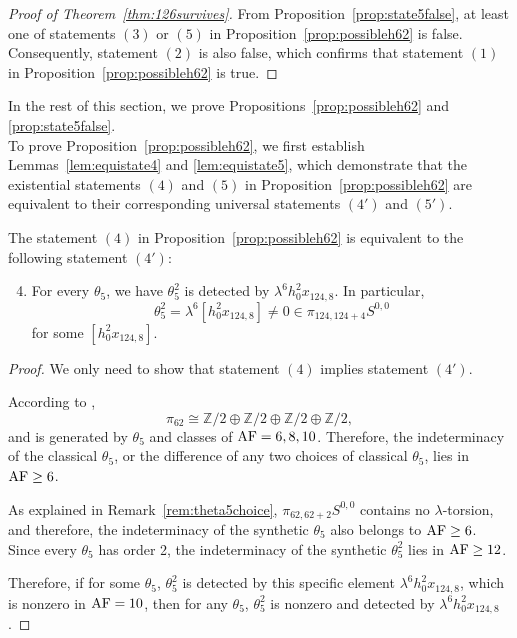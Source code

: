 \begin{proof}[Proof of Theorem~\ref{thm:126survives}]
    From Proposition~\ref{prop:state5false}, at least one of  statements $(3)$ or $(5)$ in Proposition~\ref{prop:possibleh62} is false. Consequently,  statement $(2)$ is also false, which confirms that statement $(1)$ in Proposition~\ref{prop:possibleh62} is true.  
\end{proof}

In the rest of this section, we prove Propositions~\ref{prop:possibleh62} and \ref{prop:state5false}.\\

To prove Proposition~\ref{prop:possibleh62}, we first establish Lemmas~\ref{lem:equistate4} and \ref{lem:equistate5}, which demonstrate that the existential statements $(4)$ and $(5)$ in Proposition~\ref{prop:possibleh62} are equivalent to their corresponding universal statements $(4')$ and $(5')$. 

\begin{lemma} \label{lem:equistate4}
    The statement $(4)$ in Proposition~\ref{prop:possibleh62} is equivalent to the following statement $(4')$:
    \begin{enumerate}\setcounter{enumi}{3}
    \item For every $\theta_5$, we have $\theta_5^2$ is detected by $\lambda^6 h_0^2x_{124,8}$. In particular, 
    $$\theta_5^2 = \lambda^6 [h_0^2x_{124,8}] \neq 0 \in \pi_{124,124+4}S^{0,0}$$
    for some $[h_0^2x_{124,8}]$.
    \end{enumerate}
\end{lemma}

\begin{proof}
    We only need to show that statement $(4)$ implies statement $(4')$. 
    
    According to \cite{IWX}, 
    $$\pi_{62} \cong \mathbb{Z}/2 \oplus \mathbb{Z}/2 \oplus \mathbb{Z}/2 \oplus \mathbb{Z}/2,$$ 
    and is generated by $\theta_5$ and classes of $\mathrm{AF}=6,8,10$. Therefore, the indeterminacy of the classical $\theta_5$, or the difference of any two choices of classical $\theta_5$, lies in $\mathrm{AF} \ge 6$.
    
    As explained in Remark~\ref{rem:theta5choice}, $\pi_{62,62+2}S^{0,0}$ contains no $\lambda$-torsion, and therefore, the indeterminacy of the synthetic $\theta_5$ also belongs to $\mathrm{AF} \ge 6$. Since every $\theta_5$ has order 2, the indeterminacy of the synthetic $\theta_5^2$ lies in $\mathrm{AF} \ge 12$.

    Therefore, if for some $\theta_5$, $\theta_5^2$ is detected by this specific element $\lambda^6 h_0^2x_{124,8}$, which is nonzero in $\mathrm{AF}=10$, then for any $\theta_5$, $\theta_5^2$ is nonzero and detected by $\lambda^6 h_0^2x_{124,8}$.

\end{proof}



